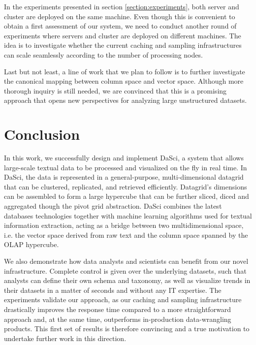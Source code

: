 \documentclass[10pt, a4paper, twocolumn]{article} %
\begin{document}
In the experiments presented in section \ref{section:experiments}, both server and cluster are deployed on the same machine.
Even though this is convenient to obtain a first assessment of our system, we need to conduct another round of experiments where servers and cluster are deployed on different machines. The idea is to investigate whether the current caching and sampling infrastructures can scale seamlessly according to the number of processing nodes.

Last but not least, a line of work that we plan to follow is to further investigate the canonical mapping between column space and vector space. Although more thorough inquiry is still needed, we are convinced that this is a promising approach that opens new perspectives for analyzing large unstructured datasets.


\section{Conclusion}
\label{section:conclusion}

In this work, we successfully design and implement DaSci, a system that allows large-scale textual data to be processed and visualized on the fly in real time.
In DaSci, the data is represented in a general-purpose, multi-dimensional datagrid that can be clustered, replicated, and retrieved efficiently.
Datagrid's dimensions can be assembled to form a large hypercube that can be further sliced, diced and aggregated though the pivot grid abstraction. 
DaSci combines the latest databases technologies together with machine learning algorithms used for textual information extraction, acting as a bridge between two multidimensional space, i.e. the vector space derived from raw text and the column space spanned by the OLAP hypercube.

We also demonstrate how data analysts and scientists can benefit from our novel infrastructure.
Complete control is given over the underlying datasets, such that analysts can define their own schema and taxonomy, as well as visualize trends in their datasets in a matter of seconds and without any IT expertise.
The experiments validate our approach, as our caching and sampling infrastructure drastically improves the response time compared to a more straightforward approach and, at the same time, outperforms in-production data-wrangling products. This first set of results is therefore convincing and a true motivation to undertake further work in this direction.
\end{document}
